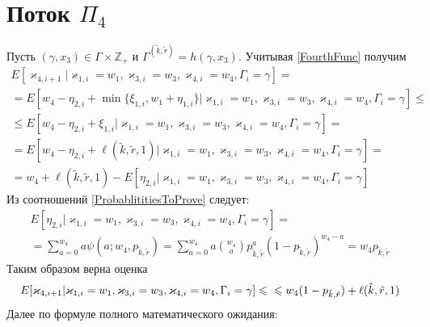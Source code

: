 \documentclass[a4paper,12pt,russian]{extarticle}
\begin{document}
\section{Поток $\Pi_4$}
Пусть $(\gamma, x_3) \in \Gamma \times {\mathbb Z}_+$ и  $\Gamma^{(\tilde{k},\tilde{r})}=h(\gamma,x_3)$. Учитывая \eqref{FourthFunc} получим
\begin{multline*}
    E[\varkappa_{4,i+1} | \varkappa_{1,i}=w_1,\varkappa_{3,i}=w_3, \varkappa_{4,i}=w_4, \Gamma_i=\gamma] = \\
    =
    E[w_4 - \eta_{2,i} +  \min{\{\xi_{1,i}, w_1 + \eta_{1,i} \}} | \varkappa_{1,i}=w_1,\varkappa_{3,i}=w_3, \varkappa_{4,i}=w_4, \Gamma_i=\gamma] \leqslant \\
    \leqslant
     E[w_4 - \eta_{2,i} +  \xi_{1,i} | \varkappa_{1,i}=w_1,\varkappa_{3,i}=w_3, \varkappa_{4,i}=w_4, \Gamma_i=\gamma] =\\ 
     = 
     E[w_4 - \eta_{2,i} +  \ell(\tilde{k},\tilde{r},1) | \varkappa_{1,i}=w_1,\varkappa_{3,i}=w_3, \varkappa_{4,i}=w_4, \Gamma_i=\gamma] = \\ 
    =
   w_4 + \ell(\tilde{k},\tilde{r},1)  -  E[\eta_{2,i} | \varkappa_{1,i}=w_1,\varkappa_{3,i}=w_3, \varkappa_{4,i}=w_4, \Gamma_i=\gamma] 
\end{multline*}
Из соотношений \eqref{ProbablititiesToProve} следует:
\begin{multline*}
  E[\eta_{2,i} | \varkappa_{1,i}=w_1,\varkappa_{3,i}=w_3, \varkappa_{4,i}=w_4, \Gamma_i=\gamma]
= \\
=
\sum_{a=0}^{w_4}  a \psi(a;w_4, p_{\tilde{k},\tilde{r}}) = 
\sum_{a=0}^{w_4} a {{w_4}\choose{a}} p_{\tilde{k},\tilde{r}}^a (1-p_{\tilde{k},\tilde{r}})^{w_4-a} = w_4 p_{\tilde{k},\tilde{r}} 
\end{multline*}
Таким образом верна оценка 
\begin{equation*}
     E[\varkappa_{4,i+1} | \varkappa_{1,i}=w_1,\varkappa_{3,i}=w_3, \varkappa_{4,i}=w_4, \Gamma_i=\gamma] \leqslant \\ 
     \leqslant
     w_4 (1-p_{\tilde{k},\tilde{r}}) + \ell(\tilde{k},\tilde{r},1)
\end{equation*}
Далее по формуле полного математического ожидания:
\end{document}
